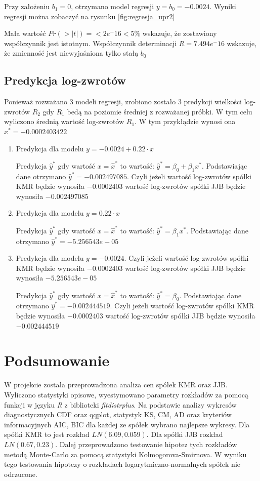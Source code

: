 \documentclass[a4paper,11pt]{article}
\begin{document}
Przy założeniu $b_{1}=0$, otrzymano model regresji $y=b_{0}= -0.0024$. Wyniki regresji można zobaczyć na rysunku \ref{fig:regresja_upr2}

Mała wartość $Pr(>|t|) = <2e^-16 < 5\%$ wskazuje, że zostawiony współczynnik jest istotnym. Współczynnik determinacji $R= 7.494e^-16$ wskazuje, że zmienność jest niewyjaśniona tylko stałą $b_{0}$

\subsection{Predykcja log-zwrotów}
Ponieważ rozważano 3 modeli regresji, zrobiono zostało 3 predykcji wielkości log-zwrotów $R_{2}$ gdy $R_{1}$ bedą na poziomie średniej z rozważanej próbki. W tym celu wyliczono średnią wartość log-zwrotów $R_{1}$. W tym przykłądzie wynosi ona $x^*=-0.0002403422$

\begin{enumerate}
  \item Predykcja dla modelu $y = -0.0024 + 0.22\cdot x$
  
  Predykcja $\hat{y}^*$ gdy wartość $x=\hat{x}^*$ to wartość: $\hat{y}^* = \beta_0 + \beta_1x^*$. Podstawiając dane otrzymano  $\hat{y}^* = -0.002497085$. Czyli jeżeli wartość log-zwrotów spółki KMR będzie wynosiła $-0.0002403$ wartość log-zwrotów spółki JJB będzie wynosiła $-0.002497085$
  
  \item Predykcja dla modelu $y =  0.22\cdot x$
  
   Predykcja $\hat{y}^*$ gdy wartość $x=\hat{x}^*$ to wartość: $\hat{y}^* =\beta_1x^*$. Podstawiając dane otrzymano  $\hat{y}^* = -5.256543e-05$
  \item Predykcja dla modelu $y = -0.0024 $. Czyli jeżeli wartość log-zwrotów spółki KMR będzie wynosiła $-0.0002403$ wartość log-zwrotów spółki JJB będzie wynosiła $-5.256543e-05$

  Predykcja $\hat{y}^*$ gdy wartość $x=\hat{x}^*$ to wartość: $\hat{y}^* = \beta_0 $. Podstawiając dane otrzymano  $\hat{y}^* = -0.002444519$. Czyli jeżeli wartość log-zwrotów spółki KMR będzie wynosiła $-0.0002403$ wartość log-zwrotów spółki JJB będzie wynosiła $-0.002444519$
\end{enumerate}


\section{Podsumowanie}

W projekcie została przeprowadzona analiza cen spółek KMR oraz JJB. Wyliczono statystyki opisowe, wyestymowano parametry rozkładów za pomocą funkcji w języku \textit{R} z biblioteki \textit{fitdistrplus}. Na podstawie analizy wykresów diagnostycznych CDF oraz qqplot, statystyk KS, CM, AD oraz kryteriów informacyjnych AIC, BIC dla każdej ze spółek wybrano najlepsze wykresy. Dla spółki KMR to jest rozkład $LN(6.09, 0.059)$. Dla spółki JJB rozkład $LN(0.67, 0.23)$. Dalej przeprowadzono testowanie hipotez tych rozkładów metodą Monte-Carlo za pomocą statystyki Kolmogorova-Smirnova. W wyniku tego testowania hipotezy o rozkładach logarytmiczno-normalnych spółek nie odrzucone.
\end{document}
